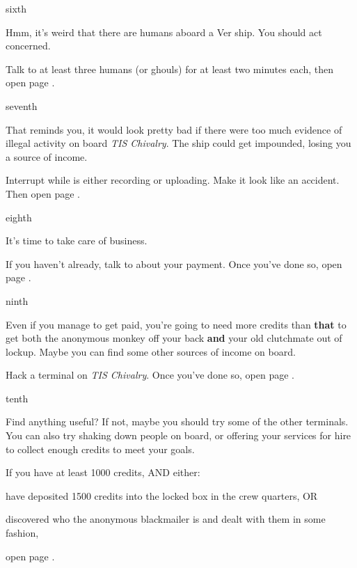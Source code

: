 \documentclass[greennotebook]{guildcamp4} %
\begin{document}
\begin{page}{sixth}

Hmm, it's weird that there are humans aboard a Ver ship. You should act concerned.

Talk to at least three humans (or ghouls) for at least two minutes each, then open page .

\end{page}

\begin{page}{seventh}

That reminds you, it would look pretty bad if there were too much evidence of illegal activity on board \emph{TIS Chivalry}. The ship could get impounded, losing you a source of income.

Interrupt \cCgood{} while \cCgood{\they} is either recording or uploading. Make it look like an accident. Then open page .

\end{page}

\begin{page}{eighth}

It's time to take care of business.

If you haven't already, talk to \cVone{} about your payment. Once you've done so, open page .

\end{page}

\begin{page}{ninth}

Even if you manage to get paid, you're going to need more credits than {\bf that} to get both the anonymous monkey off your back {\bf and} your old clutchmate out of lockup. Maybe you can find some other sources of income on board.

Hack a terminal on \emph{TIS Chivalry}. Once you've done so, open page .

\end{page}

\begin{page}{tenth}

Find anything useful? If not, maybe you should try some of the other terminals. You can also try shaking down people on board, or offering your services for hire to collect enough credits to meet your goals.

If you have at least 1000 credits, AND either:

\begin{itemz}
\item have deposited 1500 credits into the locked box in the crew quarters, OR 
\item discovered who the anonymous blackmailer is and dealt with them in some fashion,
\end{itemz}

open page .

\end{page}
\end{document}
